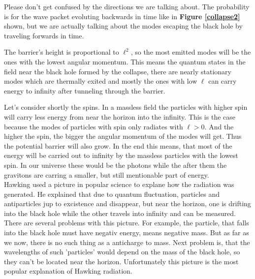 	Please don't get confused by the directions we are talking about. The probability is for the wave packet evoluting backwards in time like in \textbf{Figure \ref{collapse2}} shown, but we are actually talking about the modes escaping the black hole by traveling forwards in time.
	 
	The barrier's height is proportional to $\ell^2$, so the most emitted modes will be the ones with the lowest angular momentum. This means the quantum states in the field near the black hole formed by the collapse, there are nearly stationary modes which are thermally exited and mostly the ones with low $\ell$ can carry energy to infinity after tunneling through the barrier. 
	
	Let's consider shortly the spins. In a massless field the particles with higher spin will carry less energy from near the horizon into the infinity. This is the case because the modes of particles with spin only radiates with $\ell >0$. And the higher the spin, the bigger the angular momentum of the modes will get. Thus the potential barrier will also grow. In the end this means, that most of the energy will be carried out to infinity by the massless particles with the lowest spin. In our universe these would be the photons while the after them the gravitons are carring a smaller, but still mentionable part of energy.\\
	
	Hawking used a picture in popular science to explane how the radiation was generated. He explained that due to quantum fluctuation, particles and antiparticles jup to excistence and disappear, but near the horizon, one is drifting into the black hole while the other travels into infinity and can be measured. There are several problems with this picture. For example, the particle, that falls into the black hole must have negativ energy, means negative mass. But as far as we now, there is no such thing as a anticharge to mass. Next problem is, that the wavelengths of such 'particles' would depend on the mass of the black hole, so they can't be located near the horizon. Unfortunately this picture is the most popular explanation of Hawking radiation.
	
